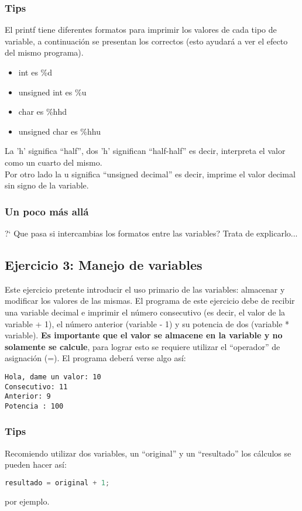\documentclass{article}
\begin{document}
\subsubsection{Tips}
El printf tiene diferentes formatos para imprimir los valores de cada tipo de variable, a continuaci\'on se presentan los correctos (esto ayudar\'a a ver el efecto del mismo programa).
\begin{itemize}
  \item int es \%d
  \item unsigned int es \%u
  \item char es \%hhd
  \item unsigned char es \%hhu
\end{itemize}
La 'h' significa ``half'', dos 'h' significan ``half-half'' es decir, interpreta el valor como un cuarto del mismo. \\
Por otro lado la u significa ``unsigned decimal'' es decir, imprime el valor decimal sin signo de la variable.
\subsubsection{Un poco m\'as all\'a}
?` Que pasa si intercambias los formatos entre las variables? Trata de explicarlo...

\subsection{Ejercicio 3: Manejo de variables}
Este ejercicio pretente introducir el uso primario de las variables: almacenar y modificar los valores de las mismas. El programa de este ejercicio debe de recibir una variable decimal e imprimir el n\'umero consecutivo (es decir, el valor de la variable + 1),  el n\'umero anterior (variable - 1) y su potencia de dos (variable * variable). \textbf{Es importante que el valor se almacene en la variable y no solamente se calcule}, para lograr esto se requiere utilizar el ``operador'' de asignaci\'on (=). El programa deber\'a verse algo as\'i:

\begin{lstlisting}[style=DOS]
Hola, dame un valor: 10
Consecutivo: 11
Anterior: 9
Potencia : 100
\end{lstlisting}
\subsubsection{Tips}
Recomiendo utilizar dos variables, un ``original'' y un ``resultado'' los c\'alculos se pueden hacer as\'i:
\begin{lstlisting}[language=C]
resultado = original + 1; 
\end{lstlisting}
por ejemplo.
\end{document}
